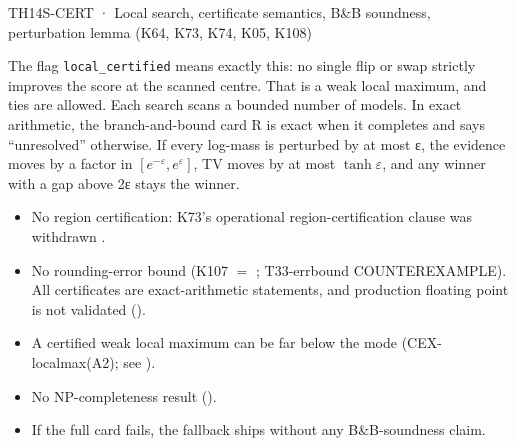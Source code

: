 \begin{card}{TH14}{S-CERT · Local search, certificate semantics, B\&B soundness, perturbation lemma (K64, K73, K74, K05, K108)}
\begin{plain}
The flag \texttt{local\_certified} means exactly this: no single flip or swap strictly improves the score at the scanned centre. That is a weak local maximum, and ties are allowed. Each search scans a bounded number of models. In exact arithmetic, the branch-and-bound card R is exact when it completes and says ``unresolved'' otherwise. If every log-mass is perturbed by at most ε, the evidence moves by a factor in $[e^{-\varepsilon},e^{\varepsilon}]$, TV moves by at most $\tanh\varepsilon$, and any winner with a gap above 2ε stays the winner.
\end{plain}
\begin{notproved}
\begin{itemize}
\item No region certification: K73's operational region-certification clause was withdrawn .
\item No rounding-error bound (K107 $=$ ; T33-errbound COUNTEREXAMPLE). All certificates are exact-arithmetic statements, and production floating point is not validated ().
\item A certified weak local maximum can be far below the mode (CEX-localmax(A2); see ).
\item No NP-completeness result ().
\item If the full card fails, the fallback ships without any B\&B-soundness claim.
\end{itemize}
\end{notproved}
\end{card}

